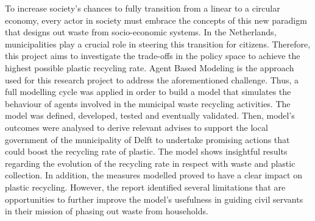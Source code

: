 To increase society's chances to fully transition from a linear to a circular economy, every actor in society must embrace the concepts of this new paradigm that designs out waste from socio-economic systems. In the Netherlands, municipalities play a crucial role in steering this transition for citizens. Therefore, this project aims to investigate the trade-offs in the policy space to achieve the highest possible plastic recycling rate. Agent Based Modeling is the approach used for this research project to address the aforementioned challenge. Thus, a full modelling cycle was applied in order to build a model that simulates the behaviour of agents involved in the municipal waste recycling activities. The model was defined, developed, tested and eventually validated. Then, model's outcomes were analysed to derive relevant advises to support the local government of the municipality of Delft to undertake promising actions that could boost the recycling rate of plastic. The model shows insightful results regarding the evolution of the recycling rate in respect with waste and plastic collection. In addition, the measures modelled proved to have a clear impact on plastic recycling. However, the report identified several limitations that are opportunities to further improve the model's usefulness in guiding civil servants in their mission of phasing out waste from households. 